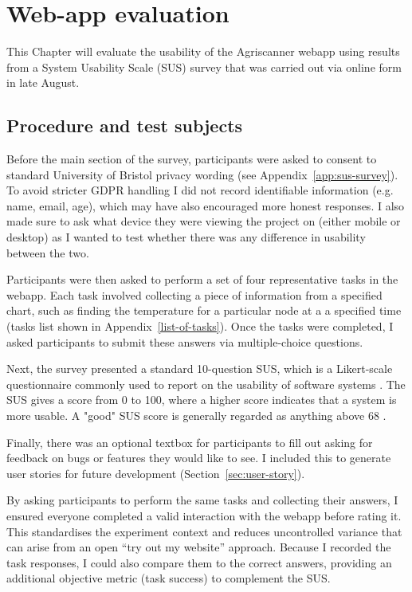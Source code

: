 \section{Web-app evaluation}

This Chapter will evaluate the usability of the Agriscanner webapp using results
from a System Usability Scale (SUS) survey that was carried out via online form
in late August.

\subsection{Procedure and test subjects}

Before the main section of the survey, participants were asked to consent to
standard University of Bristol privacy wording (see
Appendix~\ref{app:sus-survey}). To avoid stricter GDPR handling I did not record
identifiable information (e.g. name, email, age), which may have also encouraged
more honest responses. I also made sure to ask what device they were viewing the
project on (either mobile or desktop) as I wanted to test whether there was any
difference in usability between the two.

Participants were then asked to perform a set of four representative tasks in
the webapp. Each task involved collecting a piece of information from a
specified chart, such as finding the temperature for a particular node at a a
specified time (tasks list shown in Appendix~\ref{list-of-tasks}). Once the
tasks were completed, I asked participants to submit these answers via
multiple-choice questions.

Next, the survey presented a standard 10-question SUS, which is a Likert-scale
questionnaire commonly used to report on the usability of software systems
\cite{brookeSUS1995}. The SUS gives a score from 0 to 100, where a higher score
indicates that a system is more usable. A "good" SUS score is generally regarded
as anything above 68 \cite{sauro2016quantifying}.

Finally, there was an optional textbox for participants to fill out asking for
feedback on bugs or features they would like to see. I included this to generate
user stories for future development (Section~\ref{sec:user-story}).

By asking participants to perform the same tasks and collecting their answers, I
ensured everyone completed a valid interaction with the webapp before rating it.
This standardises the experiment context and reduces uncontrolled variance that
can arise from an open “try out my website” approach. Because I recorded the
task responses, I could also compare them to the correct answers, providing an
additional objective metric (task success) to complement the SUS.

